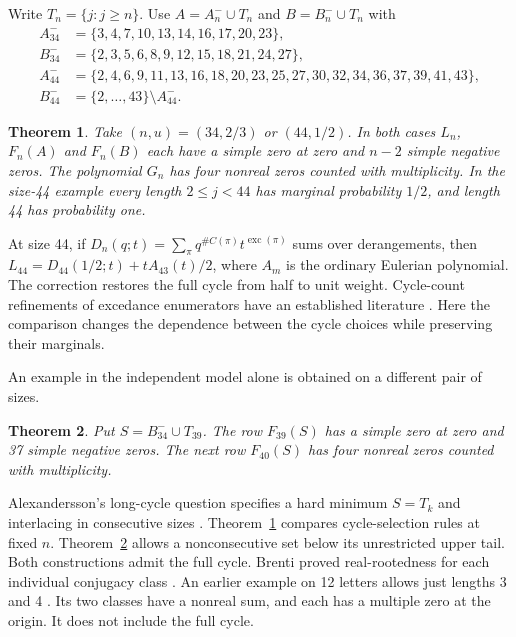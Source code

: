 \documentclass[11pt]{article}
\newtheorem{theorem}{Theorem}
\newcommand{\exc}{\operatorname{exc}}
\begin{document}
Write $T_n=\{j:j\ge n\}$. Use $A=A_n^-\cup T_n$ and $B=B_n^-\cup T_n$ with
\begin{align*}
 A_{34}^-&=\{3,4,7,10,13,14,16,17,20,23\},\\
 B_{34}^-&=\{2,3,5,6,8,9,12,15,18,21,24,27\},\\
 A_{44}^-&=\{2,4,6,9,11,13,16,18,20,23,25,27,30,32,34,36,37,39,41,43\},\\
 B_{44}^-&=\{2,\ldots,43\}\setminus A_{44}^-.
\end{align*}
\begin{theorem}\label{main}
Take $(n,u)=(34,2/3)$ or $(44,1/2)$. In both cases $L_n$, $F_n(A)$ and $F_n(B)$ each have a simple zero at zero and $n-2$ simple negative zeros. The polynomial $G_n$ has four nonreal zeros counted with multiplicity. In the size-44 example every length $2\le j<44$ has marginal probability $1/2$, and length 44 has probability one.
\end{theorem}
At size 44, if $D_n(q;t)=\sum_{\pi}q^{\#C(\pi)}t^{\exc(\pi)}$ sums over derangements, then $L_{44}=D_{44}(1/2;t)+t A_{43}(t)/2$, where $A_m$ is the ordinary Eulerian polynomial. The correction restores the full cycle from half to unit weight. Cycle-count refinements of excedance enumerators have an established literature \cite{brenti,mad}. Here the comparison changes the dependence between the cycle choices while preserving their marginals.

An example in the independent model alone is obtained on a different pair of sizes.
\begin{theorem}\label{single}
Put $S=B_{34}^-\cup T_{39}$. The row $F_{39}(S)$ has a simple zero at zero and 37 simple negative zeros. The next row $F_{40}(S)$ has four nonreal zeros counted with multiplicity.
\end{theorem}
Alexandersson's long-cycle question specifies a hard minimum $S=T_k$ and interlacing in consecutive sizes \cite{alex}. Theorem~\ref{main} compares cycle-selection rules at fixed $n$. Theorem~\ref{single} allows a nonconsecutive set below its unrestricted upper tail. Both constructions admit the full cycle. Brenti proved real-rootedness for each individual conjugacy class \cite[Thms.~3.1--3.2]{brenti}. An earlier example on 12 letters allows just lengths 3 and 4 \cite{earlier}. Its two classes have a nonreal sum, and each has a multiple zero at the origin. It does not include the full cycle.
\end{document}
